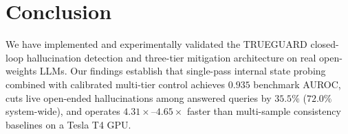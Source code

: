 \documentclass[journal]{IEEEtran}
\begin{document}
\section{Conclusion}
We have implemented and experimentally validated the TRUEGUARD closed-loop hallucination detection and three-tier mitigation architecture on real open-weights LLMs. Our findings establish that single-pass internal state probing combined with calibrated multi-tier control achieves $0.935$ benchmark AUROC, cuts live open-ended hallucinations among answered queries by $35.5\%$ ($72.0\%$ system-wide), and operates $4.31\times\text{--}4.65\times$ faster than multi-sample consistency baselines on a Tesla T4 GPU.
\end{document}
